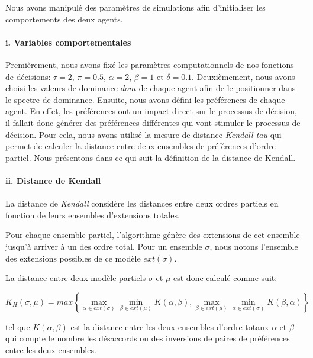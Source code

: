 				
				Nous avons manipulé des paramètres de simulations afin d'initialiser les comportements des deux agents.
				
				\paragraph{i. Variables comportementales}
				
				Premièrement, nous avons fixé les paramètres computationnels de nos fonctions de décisions: $\tau=2$, $\pi=0.5$, $\alpha=2$, $\beta=1$ et $\delta=0.1$. 
				Deuxièmement, nous avons choisi les valeurs de dominance $dom$ de chaque agent afin de le positionner dans le spectre de dominance. 
				Ensuite, nous avons défini les préférences de chaque agent. En effet, les préférences ont un impact direct sur le processus de décision, il fallait donc générer des préférences différentes qui vont stimuler le processus de décision. Pour cela, nous avons utilisé la mesure de distance \emph{Kendall tau} \cite{bra2013Kendall} qui permet de calculer la distance entre deux ensembles de préférences d'ordre partiel. 
				Nous présentons dans ce qui suit la définition de la distance de Kendall. 
				
				\vspace{1 em}
				\paragraph{ii. Distance de Kendall}
				La distance de \emph{Kendall} considère les distances entre deux ordres partiels en fonction de leurs ensembles d'extensions totales.
				
				Pour chaque ensemble partiel, l'algorithme génère des extensions de cet ensemble jusqu'à arriver à un des ordre total. Pour un ensemble $\sigma$, nous notons l'ensemble des extensions possibles de ce modèle $ext(\sigma)$.
				
				La distance entre deux modèle partiels  $\sigma$ et $\mu$ est donc calculé comme suit: 

				
				\begin{equation*}
					K_H(\sigma,\mu) = max \left \{ \max\limits_{\alpha \in ext(\sigma)} \min\limits_{\beta \in ext(\mu)} K(\alpha , \beta), \max\limits_{\beta \in ext(\mu)} \min\limits_{\alpha \in ext(\sigma)} K(\beta, \alpha)  \right \}
				\end{equation*}
				
				tel que $K(\alpha , \beta)$ est la distance entre les deux ensembles d'ordre totaux $\alpha$ et $\beta$ qui compte le nombre les désaccords ou des inversions de paires de préférences entre les deux ensembles. 
				 
